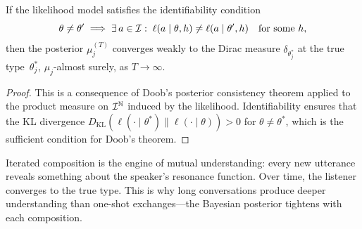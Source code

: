 \begin{theorem}
\label{thm:bayesian-consistency}
If the likelihood model satisfies the identifiability condition
\[
  \theta \neq \theta' \;\Longrightarrow\;
  \exists\, a \in \mathcal{I}:\;
  \ell(a \mid \theta, h) \neq \ell(a \mid \theta', h)
  \quad\text{for some } h,
\]
then the posterior $\mu_j^{(T)}$ converges weakly to the Dirac
measure $\delta_{\theta_j^*}$ at the true type~$\theta_j^*$,
$\mu_j$-almost surely, as $T \to \infty$.
\end{theorem}

\begin{proof}
This is a consequence of Doob's posterior consistency theorem
applied to the product measure on $\mathcal{I}^{\mathbb{N}}$ induced by the
likelihood.  Identifiability ensures that the KL divergence
$D_{\mathrm{KL}}(\ell(\cdot\mid\theta^*) \| \ell(\cdot\mid\theta)) > 0$
for $\theta \neq \theta^*$, which is the sufficient condition
for Doob's theorem.
\end{proof}

\begin{interpretation}
Iterated composition is the engine of mutual understanding:
every new utterance reveals something about the speaker's
resonance function.  Over time, the listener converges to the
true type.  This is why long conversations produce deeper
understanding than one-shot exchanges---the Bayesian posterior
tightens with each composition.
\end{interpretation}

